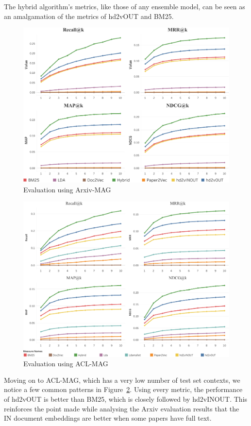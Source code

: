 The hybrid algorithm's metrics, like those of any ensemble model, can be seen as an amalgamation of the metrics of hd2vOUT and BM25.
\begin{figure}
    \centering
    \includegraphics[keepaspectratio, width=.9\linewidth]{figures/Evaluation/ArxivMetricGraphs.pdf}
    \caption{Evaluation using Arxiv-MAG}
    \label{fig:arxivmagevaluation}
\end{figure}
\begin{figure}
    \centering
    \includegraphics[keepaspectratio, width=.9\linewidth]{figures/Evaluation/ACLMetricGraphs.pdf}
    \caption{Evaluation using ACL-MAG}
    \label{fig:aclmagevaluation}
\end{figure}
Moving on to ACL-MAG, which has a very low number of test set contexts, we notice a few common patterns in Figure~\ref{fig:aclmagevaluation}. Using every metric, the performance of hd2vOUT is better than BM25, which is closely followed by hd2vINOUT. This reinforces the point made while analysing the Arxiv evaluation results that the IN document embeddings are better when some papers have full text.

